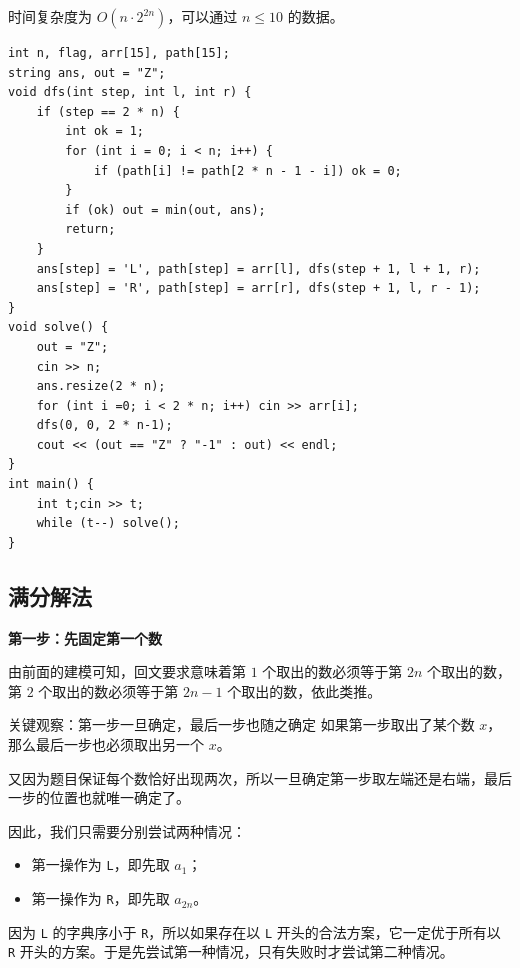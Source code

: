 \documentclass{book}
\newcommand{\code}[1]{\colorbox{codebg}{\texttt{#1}}}  %
\begin{document}
时间复杂度为 $O(n\cdot 2^{2n})$，可以通过 $n\le 10$ 的数据。

\begin{lstlisting}[style = code]
int n, flag, arr[15], path[15];
string ans, out = "Z";
void dfs(int step, int l, int r) {
    if (step == 2 * n) {
        int ok = 1;
        for (int i = 0; i < n; i++) {
            if (path[i] != path[2 * n - 1 - i]) ok = 0;
        }
        if (ok) out = min(out, ans);
        return;
    }
    ans[step] = 'L', path[step] = arr[l], dfs(step + 1, l + 1, r);
    ans[step] = 'R', path[step] = arr[r], dfs(step + 1, l, r - 1);
}
void solve() {
    out = "Z";
    cin >> n;
    ans.resize(2 * n);
    for (int i =0; i < 2 * n; i++) cin >> arr[i];
    dfs(0, 0, 2 * n-1);
    cout << (out == "Z" ? "-1" : out) << endl;
}
int main() {
    int t;cin >> t;
    while (t--) solve();
}
\end{lstlisting}

\newpage
\subsection{满分解法}

\par\medskip
\noindent\textbf{第一步：先固定第一个数}
\par\medskip

由前面的建模可知，回文要求意味着第 $1$ 个取出的数必须等于第 $2n$ 个取出的数，第 $2$ 个取出的数必须等于第 $2n-1$ 个取出的数，依此类推。

\begin{keybox}{关键观察：第一步一旦确定，最后一步也随之确定}
如果第一步取出了某个数 $x$，那么最后一步也必须取出另一个 $x$。

又因为题目保证每个数恰好出现两次，所以一旦确定第一步取左端还是右端，最后一步的位置也就唯一确定了。
\end{keybox}

因此，我们只需要分别尝试两种情况：

\begin{itemize}[leftmargin=2em,itemsep=1pt,topsep=2pt,parsep=0pt,partopsep=0pt]
    \item 第一操作为 \code{L}，即先取 $a_1$；
    \item 第一操作为 \code{R}，即先取 $a_{2n}$。
\end{itemize}

因为 \code{L} 的字典序小于 \code{R}，所以如果存在以 \code{L} 开头的合法方案，它一定优于所有以 \code{R} 开头的方案。于是先尝试第一种情况，只有失败时才尝试第二种情况。
\end{document}
